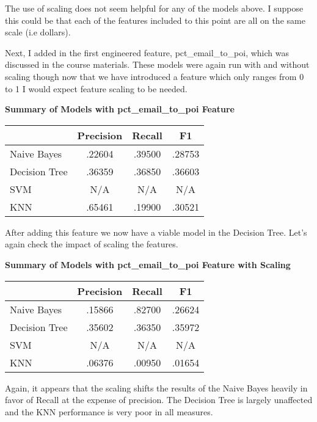 \documentclass[a4paper,11pt]{report}
\begin{document}
The use of scaling does not seem helpful for any of the models above.  I suppose
this could be that each of the features included to this point are all on the
same scale (i.e dollars).

Next, I added in the first engineered feature, pct\_email\_to\_poi, which was discussed in the course
materials.  These models were again run with and without scaling though now that
we have introduced a feature which only ranges from 0 to 1 I would expect
feature scaling to be needed.

\textbf{Summary of Models with pct\_email\_to\_poi Feature}
\begin{center}
    \begin{tabular}{|| l c c c ||}
        \hline & Precision & Recall & F1 \\
        \hline\hline
        Naive Bayes & .22604 & .39500 & .28753 \\
        \hline
        Decision Tree & .36359 & .36850 & .36603 \\
        \hline
        SVM & N/A & N/A & N/A \\
        \hline
        KNN & .65461 & .19900 & .30521  \\
        \hline
    \end{tabular}
\end{center}

After adding this feature we now have a viable model in the Decision Tree.
Let's again check the impact of scaling the features.

\textbf{Summary of Models with pct\_email\_to\_poi Feature with Scaling}
\begin{center}
    \begin{tabular}{|| l c c c ||}
        \hline & Precision & Recall & F1 \\
        \hline\hline
        Naive Bayes & .15866 & .82700 & .26624 \\
        \hline
        Decision Tree & .35602 & .36350 & .35972 \\
        \hline
        SVM & N/A & N/A & N/A \\
        \hline
        KNN & .06376 & .00950 & .01654  \\
        \hline
    \end{tabular}
\end{center}

Again, it appears that the scaling shifts the results of the Naive Bayes heavily
in favor of Recall at the expense of precision.  The Decision Tree is largely
unaffected and the KNN performance is very poor in all measures.
\end{document}
